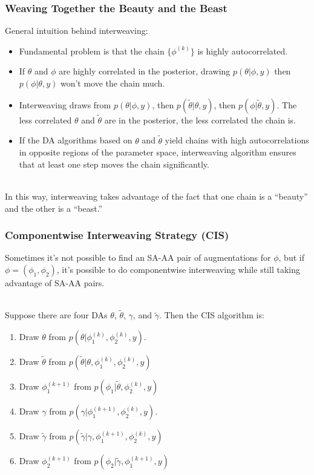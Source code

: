 \documentclass[xcolor=dvipsnames]{beamer}
\begin{document}
\begin{frame}
  \frametitle{Weaving Together the Beauty and the Beast}
  General intuition behind interweaving:
  \begin{itemize}
   \item Fundamental problem is that the chain $\{\phi^{(k)}\}$ is highly autocorrelated.
   \item If $\theta$ and $\phi$ are highly correlated in the posterior, drawing $p(\theta|\phi,y)$ then $p(\phi|\theta,y)$ won't move the chain much.\pause
   \item Interweaving draws from $p(\theta|\phi,y)$, then $p(\tilde{\theta}|\theta,y)$, then $p(\phi|\tilde{\theta},y)$. The less correlated $\theta$ and $\tilde{\theta}$ are in the posterior, the less correlated the chain is.
   \item If the DA algorithms based on $\theta$ and $\tilde{\theta}$ yield chains with high autocorrelations in opposite regions of the parameter space, interweaving algorithm ensures that at least one step moves the chain significantly.\\~\\
  \end{itemize}
  \pause
  
  In this way, interweaving takes advantage of the fact that one chain is a ``beauty'' and the other is a ``beast.''
\end{frame}

\begin{frame}
  \frametitle{Componentwise Interweaving Strategy (CIS)}
Sometimes it's not possible to find an SA-AA pair of augmentations for $\phi$, but if $\phi=(\phi_1, \phi_2)$, it's possible to do componentwise interweaving while still taking advantage of SA-AA pairs.\\~\\\pause

Suppose there are four DAs $\theta$, $\tilde{\theta}$, $\gamma$, and $\tilde{\gamma}$. Then the CIS algorithm is:
  \begin{enumerate}
    \item Draw $\theta$ from $p(\theta|\phi^{(k)}_1, \phi^{(k)}_2, y)$.
    \item Draw $\tilde{\theta}$ from $p(\tilde{\theta}|\theta,\phi^{(k)}_1, \phi^{(k)}_2, y)$
    \item Draw $\phi_1^{(k+1)}$ from $p(\phi_1|\tilde{\theta},\phi_2^{(k)},y)$
    \item Draw $\gamma$ from $p(\gamma|\phi^{(k+1)}_1, \phi^{(k)}_2, y)$.
    \item Draw $\tilde{\gamma}$ from $p(\tilde{\gamma}|\gamma,\phi^{(k+1)}_1, \phi^{(k)}_2, y)$
    \item Draw $\phi_2^{(k+1)}$ from $p(\phi_2|\tilde{\gamma},\phi_1^{(k+1)},y)$\\~\\
  \end{enumerate}
  
\end{frame}
\end{document}
